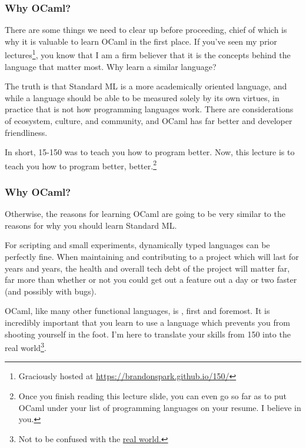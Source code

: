\documentclass[aspectratio=169, handout]{beamer}
\begin{document}
\begin{frame}[fragile]
  \frametitle{Why OCaml?}

  There are some things we need to clear up before proceeding, chief of which is
  why it is valuable to learn OCaml in the first place. If you've seen my prior
  lectures\footnote{Graciously hosted at
  {\color{blue}\href{https://brandonspark.github.io/150/}{https://brandonspark.github.io/150/}}},
  you know that I am a firm believer that it is the concepts behind the language
  that matter most. Why learn a similar language?

  \vspace{\fill}

  The truth is that Standard ML is a more academically oriented language, and
  while a language should be able to be measured solely by its own virtues, in
  practice that is not how programming languages work. There are considerations
  of ecosystem, culture, and community, and OCaml has far better 
  and developer friendliness.

  \vspace{\fill}

  In short, 15-150 was to teach you how to program better. Now, this lecture is
  to teach you how to program better, better.\footnote{Once you finish
  reading this lecture slide, you can even go so far as to put OCaml under your
  list of programming languages on your resume. I believe in you.}
\end{frame}

\begin{frame}[fragile]
  \frametitle{Why OCaml?}

  Otherwise, the reasons for learning OCaml are going to be very similar to
  the reasons for why you should learn Standard ML.

  \vspace{\fill}

  For scripting and small experiments, dynamically typed languages can be
  perfectly fine. When maintaining and contributing to a project which will last
  for years and years, the health and overall tech debt of the project will
  matter far, far more than whether or not you could get out a feature out a
  day or two faster (and possibly with bugs).

  \vspace{\fill}

  OCaml, like many other functional languages, is , first and foremost.
  It is incredibly important that you learn to use a language which prevents you
  from shooting yourself in the foot. I'm here to translate your skills from 150
  into the real world\footnote{Not to be confused with the {\color{blue} \href{https://dev.realworldocaml.org/}{real world.}}}.
\end{frame}
\end{document}
